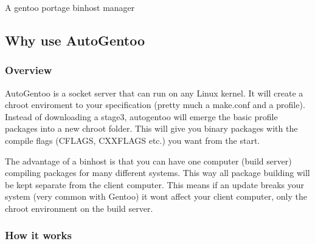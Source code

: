 A gentoo portage binhost manager

\subsection*{Why use Auto\+Gentoo}

\subsubsection*{Overview}

Auto\+Gentoo is a socket server that can run on any Linux kernel. It will create a chroot enviroment to your specification (pretty much a make.\+conf and a profile). Instead of downloading a stage3, autogentoo will emerge the basic profile packages into a new chroot folder. This will give you binary packages with the compile flags (C\+F\+L\+A\+GS, C\+X\+X\+F\+L\+A\+GS etc.) you want from the start.

The advantage of a binhost is that you can have one computer (build server) compiling packages for many different systems. This way all package building will be kept separate from the client computer. This means if an update breaks your system (very common with Gentoo) it won\textquotesingle{}t affect your client computer, only the chroot environment on the build server.

\subsubsection*{How it works}

 